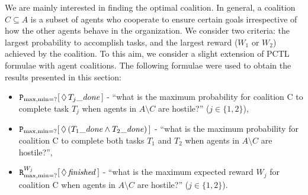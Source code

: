 \documentclass{llncs}
\begin{document}
We are mainly interested in finding the optimal coalition. In general,
a coalition $C{\subseteq}A$ is a subset of agents who cooperate to ensure certain goals irrespective of how the other agents behave in the organization. We consider two criteria: the largest probability to accomplish tasks, and the largest reward ($W_1$ or $W_2$) achieved by the coalition. To this aim, we consider a slight extension of PCTL formulae with agent coalitions. The following formulae were used to obtain the results presented in this section:
\begin{itemize}
 \item ${\tt P}_{\max,\min=?}[\,\Diamond\,T_{j} \mathit{\_done}\,]$ -
``what is the maximum probability for coalition C to complete task $T_j$ when agents in $A\setminus C$ are hostile?'' ($j\in\{1,2\}$),
 \item ${\tt P}_{\max,\min=?}[\,\Diamond\,(T_{1}\mathit{\_done} \wedge T_2 \mathit{\_done})\,]$ -
``what is the maximum probability for coalition C to complete both tasks $T_1$ and $T_2$ when agents in $A\setminus C$ are hostile?'',
 \item ${\tt R}_{\max,\min=?}^{W_{j}}[\,\Diamond\,\mathit{finished}\,]$ -
``what is the maximum expected reward $W_j$ for coalition C when agents in $A\setminus C$ are hostile?'' ($j\in\{1,2\}$).
\end{itemize}
\end{document}
